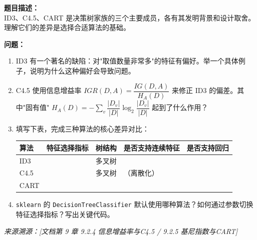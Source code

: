 \documentclass[a4paper,11pt]{ctexart}
\begin{document}
\begin{problembox}
    \textbf{题目描述：}\\
    ID3、C4.5、CART 是决策树家族的三个主要成员，各有其发明背景和设计取舍。理解它们的差异是选择合适算法的基础。

    \vspace{0.3cm}
    \textbf{问题：}
    \begin{enumerate}[(1)]
        \item ID3 有一个著名的缺陷：对"取值数量非常多"的特征有偏好。举一个具体例子，说明为什么这种偏好会导致问题。

        \item C4.5 使用信息增益率 $IGR(D,A) = \dfrac{IG(D,A)}{H_A(D)}$ 来修正 ID3 的偏差。其中"固有值" $H_A(D) = -\sum_v \dfrac{|D_v|}{|D|}\log_2 \dfrac{|D_v|}{|D|}$ 起到了什么作用？

        \item 填写下表，完成三种算法的核心差异对比：

        \begin{center}
        \begin{tabular}{p{2cm} p{2.8cm} p{2.8cm} p{3cm} p{2.5cm}}
            \toprule
            算法 & 特征选择指标 & 树结构 & 是否支持连续特征 & 是否支持回归 \\
            \midrule
            ID3 & \underline{\hspace{1.5cm}} & 多叉树 & \underline{\quad} & \underline{\quad} \\[1em]
            C4.5 & \underline{\hspace{1.5cm}} & 多叉树 & \underline{\quad}（离散化） & \underline{\quad} \\[1em]
            CART & \underline{\hspace{1.5cm}} & \underline{\hspace{1.5cm}} & \underline{\quad} & \underline{\quad} \\
            \bottomrule
        \end{tabular}
        \end{center}

        \item \texttt{sklearn} 的 \texttt{DecisionTreeClassifier} 默认使用哪种算法？如何通过参数切换特征选择指标？写出关键代码。
    \end{enumerate}

    \vspace{0.2cm}
    {\color{gray}\small\textit{来源溯源：[文档第 9 章 9.2.4 信息增益率与C4.5 / 9.2.5 基尼指数与CART]}}
\end{problembox}
\end{document}
